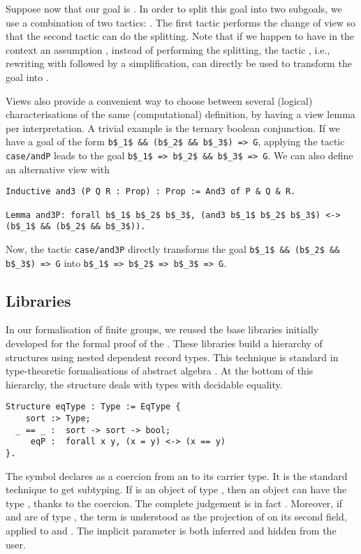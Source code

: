 Suppose now that our goal is .
In order to split this goal into two subgoals, we use a combination of
two tactics: .
The first tactic performs the change of view so that the 
second tactic can do the splitting. Note that if we happen to
have in the context an assumption ,
instead of performing the splitting, the tactic
, i.e., rewriting with  followed by  a simplification,
can directly be used to transform the goal  into .


Views also provide a convenient way to choose between 
several (logical) characterisations of the same (computational)
definition, by having a view lemma per interpretation.
A trivial example is the ternary boolean conjunction.
If we have a goal of the form
\lstinline[basicstyle=\footnotesize]+b$_1$ && (b$_2$ && b$_3$) => G+,
applying the tactic \lstinline[basicstyle=\footnotesize]+case/andP+ leads to the
goal \lstinline[basicstyle=\footnotesize]+b$_1$ => b$_2$ && b$_3$ => G+.
We can also define an alternative view with
\begin{lstlisting}
Inductive and3 (P Q R : Prop) : Prop := And3 of P & Q & R.

Lemma and3P: forall b$_1$ b$_2$ b$_3$, (and3 b$_1$ b$_2$ b$_3$) <-> (b$_1$ && (b$_2$ && b$_3$)). 
\end{lstlisting}
Now, the tactic \lstinline[basicstyle=\footnotesize]+case/and3P+  directly transforms the goal
\lstinline[basicstyle=\footnotesize]+b$_1$ && (b$_2$ && b$_3$) => G+ into \lstinline[basicstyle=\footnotesize]+b$_1$ => b$_2$ => b$_3$ => G+.


\subsection{Libraries}\label{ssec:lib}


In our formalisation of finite groups, we reused the base libraries
initially  developed for the
formal proof of the \FCT. These libraries build a hierarchy of
structures using nested dependent record types. This technique is
standard in type-theoretic formalisations of abstract algebra \cite{bailey}.
At the bottom of this hierarchy, the structure  deals with
types with decidable equality.
\begin{lstlisting}
Structure eqType : Type := EqType {
    sort :> Type; 
  _ == _ :  sort -> sort -> bool; 
     eqP :  forall x y, (x = y) <-> (x == y)
}.
\end{lstlisting}
\noindent
The \C{:>} symbol declares  as a coercion from an  to its
carrier type. It is the standard technique to get subtyping. If 
is an object of type , then an object  can have the type
, thanks to the  coercion. The complete judgement is
in fact . Moreover, if  and  are of type ,
the term  is understood as the
projection of  on its second field, applied to  and .
The implicit  parameter is both inferred and hidden from the user.

